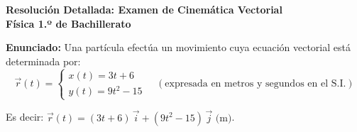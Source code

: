 ﻿\documentclass[11pt,a4paper]{article}
\begin{document}
\pagestyle{empty}

\begin{center}
    {\LARGE \textbf{Resolución Detallada: Examen de Cinemática Vectorial}}\\[4pt]
    {\large \textbf{Física 1.º de Bachillerato}}
\end{center}

\vspace{0.3cm}
\noindent\textbf{Enunciado:} Una partícula efectúa un movimiento cuya ecuación vectorial está determinada por:
\[
\vec{r}(t) = 
\begin{cases}
x(t) = 3t + 6 \\
y(t) = 9t^2 - 15
\end{cases}
\quad (\text{expresada en metros y segundos en el S.I.})
\]

\noindent Es decir: $\vec{r}(t) = (3t + 6)\,\vec{i} + (9t^2 - 15)\,\vec{j}\text{ (m)}$.
\end{document}
